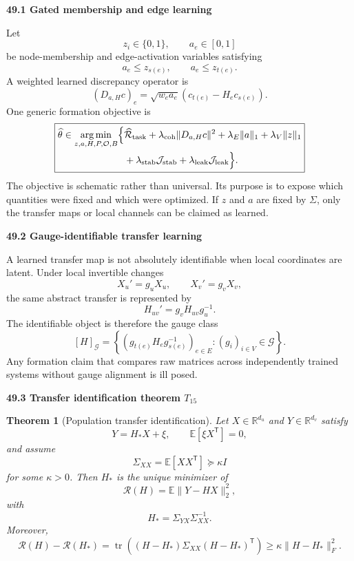 \documentclass[11pt,letterpaper]{article}
\DeclareMathOperator*{\argmin}{arg\,min}
\newcommand{\subtopic}[1]{%
 \vspace{0.45em}
 {\bfseries\color{AccentColor} #1\par}
}
\theoremstyle{plain}
\newtheorem{theorem}{Theorem}
\theoremstyle{definition}
\begin{document}
\subtopic{49.1 Gated membership and edge learning}

Let
\[
z_i\in\{0,1\},
\qquad
a_e\in[0,1]
\]
be node-membership and edge-activation variables satisfying
\[
a_e\leq z_{s(e)},
\qquad
a_e\leq z_{t(e)}.
\]
A weighted learned discrepancy operator is
\[
(D_{a,H}c)_e
=
\sqrt{w_ea_e}
\left(
 c_{t(e)}-H_ec_{s(e)}
\right).
\]
One generic formation objective is
\[
\boxed{
\begin{aligned}
\widehat\theta
\in
\argmin_{z,a,H,P,\mathcal O,B}
\Bigl
\{&
\widehat{\mathcal R}_{\mathrm{task}}
+
\lambda_{\mathrm{coh}}\|D_{a,H}c\|^2
+
\lambda_E\|a\|_1
+
\lambda_V\|z\|_1\\
&+
\lambda_{\mathrm{stab}}\mathcal J_{\mathrm{stab}}
+
\lambda_{\mathrm{leak}}\mathcal J_{\mathrm{leak}}
\Bigr\}.
\end{aligned}
}
\]
The objective is schematic rather than universal. Its purpose is to expose
which quantities were fixed and which were optimized. If \(z\) and \(a\) are
fixed by \(\Sigma\), only the transfer maps or local channels can be claimed as
learned.

\subtopic{49.2 Gauge-identifiable transfer learning}

A learned transfer map is not absolutely identifiable when local coordinates
are latent. Under local invertible changes
\[
X_u'=g_uX_u,
\qquad
X_v'=g_vX_v,
\]
the same abstract transfer is represented by
\[
H_{uv}'=g_vH_{uv}g_u^{-1}.
\]
The identifiable object is therefore the gauge class
\[
[H]_{\mathcal G}
=
\left\{
(g_{t(e)}H_eg_{s(e)}^{-1})_{e\in E}
:
(g_i)_{i\in V}\in\mathcal G
\right\}.
\]
Any formation claim that compares raw matrices across independently trained
systems without gauge alignment is ill posed.

\subtopic{49.3 Transfer identification theorem \(T_{15}\) }

\begin{theorem}[Population transfer identification]\label{thm:transfer-identification}
Let \(X\in\mathbb R^{d_u}\) and \(Y\in\mathbb R^{d_v}\) satisfy
\[
Y=H_*X+\xi,
\qquad
\mathbb E[\xi X^{\mathsf T}]=0,
\]
and assume
\[
\Sigma_{XX}
=
\mathbb E[XX^{\mathsf T}]
\succeq
\kappa I
\]
for some \(\kappa>0\). Then \(H_*\) is the unique minimizer of
\[
\mathcal R(H)
=
\mathbb E\|Y-HX\|_2^2,
\]
with
\[
\boxed{
H_*
=
\Sigma_{YX}\Sigma_{XX}^{-1}.
}
\]
Moreover,
\[
\boxed{
\mathcal R(H)-\mathcal R(H_*)
=
\operatorname{tr}
\left(
(H-H_*)\Sigma_{XX}(H-H_*)^{\mathsf T}
\right)
\geq
\kappa\|H-H_*\|_F^2.
}
\]
\end{theorem}
\end{document}
